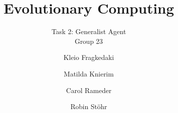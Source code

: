 \documentclass[sigconf]{acmart}
\begin{document}
\title{\vspace{-3em}Evolutionary Computing}   
\subtitle{Task 2: Generalist Agent \\ Group 23}


\author{Kleio Fragkedaki}
\author{Matilda Knierim}

\author{Carol Rameder}

\author{Robin Stöhr}


%
%


\maketitle





\vspace{-3em}



%
\clearpage
%
%
%
\printbibliography
\end{document}
